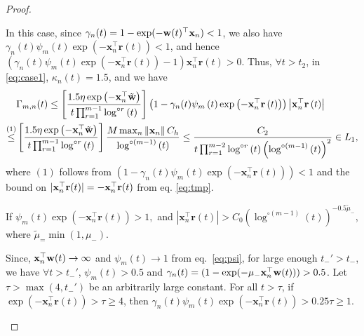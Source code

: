 \documentclass[twoside,11pt,english]{article}
\begin{document}
\begin{proof}
\begin{asparaenum}
\begin{compactenum}
In this case, since $\gamma_n(t)=1-\exp(-\mathbf{w}(t)^\top\mathbf{x}_{n})<1$, we also have $\gamma_n(t)\psi_{m}\left(t\right)\exp\left(-\mathbf{x}_{n}^{\top}\mathbf{r}\left(t\right)\right)<1$, and hence $\left(\gamma_n(t)\psi_{m}\left(t\right)\exp\left(-\mathbf{x}_{n}^{\top}\mathbf{r}\left(t\right)\right)-1\right)\mathbf{x}_{n}^{\top}\mathbf{r}(t)>0$. Thus, $\forall t>t_{2}$, in \ref{eq:case1}, $\kappa_n(t)=1.5$, and we have 
\begin{align*}
 &\Gamma_{m,n}(t)\le \left[\frac{1.5 \eta\exp\left(-\mathbf{x}_{n}^{\top}\tilde{\mathbf{w}}\right)}{t\prod_{r=1}^{m-1}\log^{\circ r}\left(t\right)}\right]\left(1-\gamma_n(t)\psi_{m}\left(t\right)\exp\left(-\mathbf{x}_{n}^{\top}\mathbf{r}\left(t\right)\right)\right)\left|\mathbf{x}_{n}^{\top}\mathbf{r}\left(t\right)\right|\\
\overset{(1)}\leq & \left[\frac{1.5 \eta\exp\left(-\mathbf{x}_{n}^{\top}\tilde{\mathbf{w}}\right)}{t\prod_{r=1}^{m-1}\log^{\circ r}\left(t\right)}\right]\frac{M\max_{n}\left\Vert \mathbf{x}_{n}\right\Vert C_{h}}{\log^{\circ\left(m-1\right)}\left(t\right)}\leq \frac{C_2}{t\prod_{r=1}^{m-2}\log^{\circ r}\left(t\right)\left(\log^{\circ (m-1)}\left(t\right)\right)^{2}}\in L_{1}, 
\end{align*}
where $(1)$ follows from $\left(1-\gamma_n(t)\psi_{m}\left(t\right)\exp\left(-\mathbf{x}_{n}^{\top}\mathbf{r}\left(t\right)\right)\right)<1$ and the bound on $|\mathbf{x}_{n}^\top\mathbf{r}(t)|=-\mathbf{x}_{n}^\top\mathbf{r}(t)$ from eq. \ref{eq:tmp}. 
\item If $\psi_{m}\left(t\right)\exp\left(-\mathbf{x}_{n}^{\top}\mathbf{r}\left(t\right)\right)>1,$ and $\left|\mathbf{x}_{n}^{\top}\mathbf{r}\left(t\right)\right|>C_0\left(\log^{\circ (m-1)}(t)\right)^{-0.5\tilde{\mu}_-}$, where $\tilde{\mu}_=\min{(1,\mu_-)}$. 

Since, $\mathbf{x}_{n}^{\top}\mathbf{w}(t)\to\infty$ and $\psi_m(t)\to 1$ from eq.~\ref{eq:psi}, for large enough $t_-'>t_-$, we have  $\forall t>t_-'$, $\psi_m(t)>0.5$ and  $\gamma_n(t)=(1-\exp(-\mu_-\mathbf{x}_{n}^{\top}\mathbf{w}(t)))>0.5$. Let $\tau>\max{(4,t_-')}$ be an arbitrarily large constant. For all $t>\tau$, if $\exp\left(-\mathbf{x}_{n}^{\top}\mathbf{r}\left(t\right)\right)>\tau\ge4$, then $\gamma_n(t)\psi_m(t)\exp\left(-\mathbf{x}_{n}^{\top}\mathbf{r}\left(t\right)\right)> 0.25\tau\ge1$.


\end{compactenum}
\end{asparaenum}
\end{proof}
\end{document}
